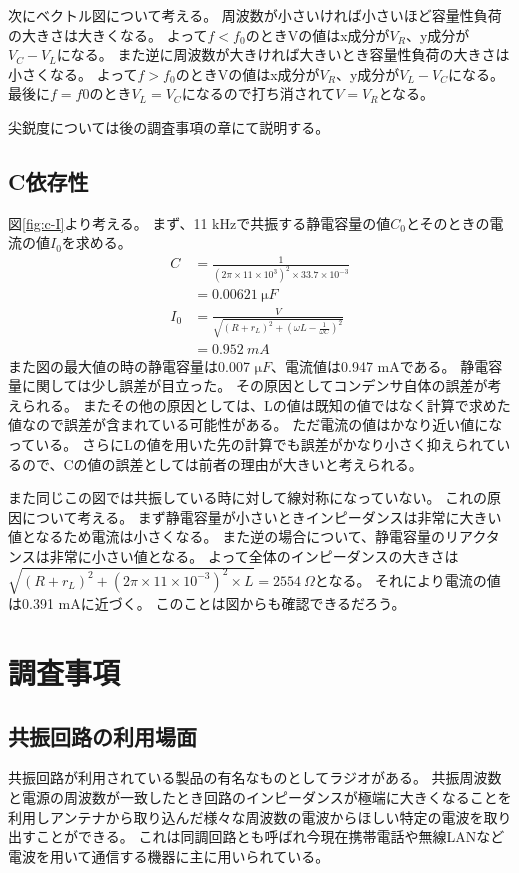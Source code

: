 \documentclass[11pt,a4paper,fleqn]{jsarticle}
\begin{document}
次にベクトル図について考える。
周波数が小さいければ小さいほど容量性負荷の大きさは大きくなる。
よって$f<f_{0}$のときVの値はx成分が$V_{R}$、y成分が$V_{C}-V_{L}$になる。
また逆に周波数が大きければ大きいとき容量性負荷の大きさは小さくなる。
よって$f>f_{0}$のときVの値はx成分が$V_{R}$、y成分が$V_{L}-V_{C}$になる。
最後に$f=f{0}$のとき$V_{L}=V_{C}$になるので打ち消されて$V=V_{R}$となる。

尖鋭度については後の調査事項の章にて説明する。

\subsection{C依存性}
図\ref{fig:c-I}より考える。
まず、11 kHzで共振する静電容量の値$C_{0}$とそのときの電流の値$I_{0}$を求める。
\begin{align}
C&=\frac{1}{(2\pi \times 11\times 10^{3})^2\times 33.7\times 10^{-3}}\\
&=0.00621\ \si{\micro F}\\
I_{0}&=\frac{V}{\sqrt{(R+r_{L})^2+(\omega L-\frac{1}{\omega C})^2}}\\
&=0.952\ \si{mA}
\end{align}
また図の最大値の時の静電容量は0.007 $\si{\micro F}$、電流値は0.947 mAである。
静電容量に関しては少し誤差が目立った。
その原因としてコンデンサ自体の誤差が考えられる。
またその他の原因としては、Lの値は既知の値ではなく計算で求めた値なので誤差が含まれている可能性がある。
ただ電流の値はかなり近い値になっている。
さらにLの値を用いた先の計算でも誤差がかなり小さく抑えられているので、Cの値の誤差としては前者の理由が大きいと考えられる。

また同じこの図では共振している時に対して線対称になっていない。
これの原因について考える。
まず静電容量が小さいときインピーダンスは非常に大きい値となるため電流は小さくなる。
また逆の場合について、静電容量のリアクタンスは非常に小さい値となる。
よって全体のインピーダンスの大きさは$\sqrt{(R+r_{L})^2+(2\pi \times 11\times 10^{-3})^2\times L}=2554\ \Omega$となる。
それにより電流の値は0.391 mAに近づく。
このことは図からも確認できるだろう。

\section{調査事項}
\subsection{共振回路の利用場面}
共振回路が利用されている製品の有名なものとしてラジオがある。
共振周波数と電源の周波数が一致したとき回路のインピーダンスが極端に大きくなることを利用しアンテナから取り込んだ様々な周波数の電波からほしい特定の電波を取り出すことができる。
これは同調回路とも呼ばれ今現在携帯電話や無線LANなど電波を用いて通信する機器に主に用いられている。
\end{document}

